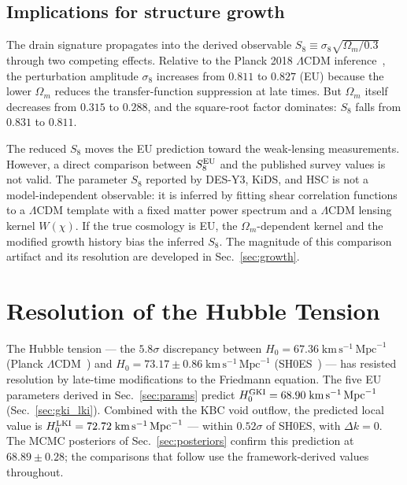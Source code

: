 \documentclass[a4paper,fleqn]{cas-dc}
\begin{document}
\subsection{Implications for structure growth}
\label{sec:drain_wl}

The drain signature propagates into the derived
observable $S_8 \equiv \sigma_8\sqrt{\Omega_m/0.3}$
through two competing effects. Relative to the Planck
2018 $\Lambda$CDM inference~\cite{planck2018}, the
perturbation amplitude $\sigma_8$ increases from $0.811$
to $0.827$ (EU) because the lower $\Omega_m$ reduces the
transfer-function suppression at late times. But
$\Omega_m$ itself decreases from $0.315$ to $0.288$,
and the square-root factor dominates: $S_8$ falls from
$0.831$ to $0.811$.

The reduced $S_8$ moves the EU prediction toward the
weak-lensing measurements. However, a direct comparison
between $S_8^{\rm EU}$ and the published survey values
is not valid. The parameter $S_8$ reported by DES-Y3,
KiDS, and HSC is not a model-independent observable: it
is inferred by fitting shear correlation functions
to a $\Lambda$CDM template with a fixed matter power
spectrum and a $\Lambda$CDM lensing kernel $W(\chi)$.
If the true cosmology is EU, the
$\Omega_m$-dependent kernel and the modified growth
history bias the inferred $S_8$. The magnitude of this
comparison artifact and its resolution are developed in
Sec.~\ref{sec:growth}.

\section{Resolution of the Hubble Tension}
\label{sec:hubble}

The Hubble tension --- the $5.8\sigma$ discrepancy between
$H_0 = 67.36\;\text{km}\,\text{s}^{-1}\,\text{Mpc}^{-1}$ (Planck
$\Lambda$CDM~\cite{planck2018}) and
$H_0 = 73.17 \pm 0.86\;\text{km}\,\text{s}^{-1}\,\text{Mpc}^{-1}$
(SH0ES~\cite{breuval2024}) --- has resisted resolution by
late-time modifications to the Friedmann equation.
The five EU parameters derived in Sec.~\ref{sec:params}
predict $H_0^{\rm GKI} = 68.90\;\text{km}\,\text{s}^{-1}\,\text{Mpc}^{-1}$
(Sec.~\ref{sec:gki_lki}). Combined with the KBC void
outflow, the predicted local value is
$H_0^{\rm LKI} = 72.72\;\text{km}\,\text{s}^{-1}\,\text{Mpc}^{-1}$ ---
within $0.52\sigma$ of SH0ES, with $\Delta k = 0$.
The MCMC posteriors of Sec.~\ref{sec:posteriors}
confirm this prediction at $68.89 \pm 0.28$;
the comparisons that follow use the framework-derived
values throughout.
\end{document}
